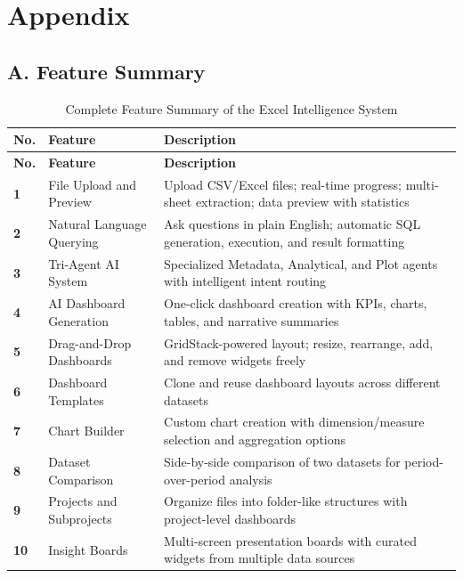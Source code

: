 \documentclass[12pt,a4paper]{report}
\begin{document}
\newpage
\chapter*{Appendix}

\section*{A. Feature Summary}

\begin{longtable}{>{\bfseries}p{1cm} p{4cm} p{7.5cm}}
\caption{Complete Feature Summary of the Excel Intelligence System} \\
\toprule
\textbf{No.} & \textbf{Feature} & \textbf{Description} \\
\midrule
\endfirsthead
\toprule
\textbf{No.} & \textbf{Feature} & \textbf{Description} \\
\midrule
\endhead
1 & File Upload and Preview & Upload CSV/Excel files; real-time progress; multi-sheet extraction; data preview with statistics \\
\midrule
2 & Natural Language Querying & Ask questions in plain English; automatic SQL generation, execution, and result formatting \\
\midrule
3 & Tri-Agent AI System & Specialized Metadata, Analytical, and Plot agents with intelligent intent routing \\
\midrule
4 & AI Dashboard Generation & One-click dashboard creation with KPIs, charts, tables, and narrative summaries \\
\midrule
5 & Drag-and-Drop Dashboards & GridStack-powered layout; resize, rearrange, add, and remove widgets freely \\
\midrule
6 & Dashboard Templates & Clone and reuse dashboard layouts across different datasets \\
\midrule
7 & Chart Builder & Custom chart creation with dimension/measure selection and aggregation options \\
\midrule
8 & Dataset Comparison & Side-by-side comparison of two datasets for period-over-period analysis \\
\midrule
9 & Projects and Subprojects & Organize files into folder-like structures with project-level dashboards \\
\midrule
10 & Insight Boards & Multi-screen presentation boards with curated widgets from multiple data sources \\

\end{longtable}
\end{document}
